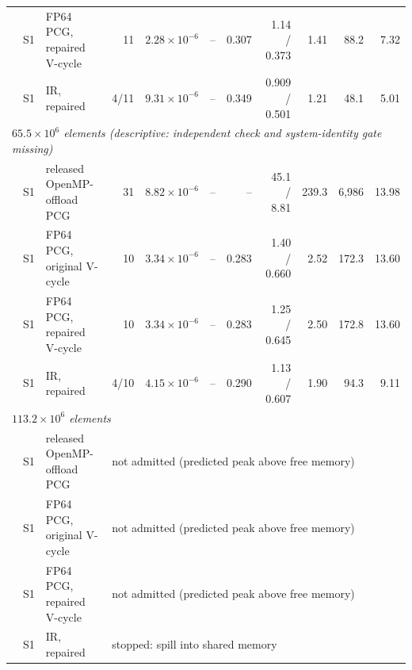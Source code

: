 \begin{tabular}{rllrrrrrrrr}
 & S1 & FP64 PCG, repaired V-cycle & 11 & $2.28\times10^{-6}$ & -- & 0.307 & 1.14 / 0.373 & 1.41 & 88.2 & 7.32 \\
 & S1 & IR, repaired & 4/11 & $9.31\times10^{-6}$ & -- & 0.349 & 0.909 / 0.501 & 1.21 & 48.1 & 5.01 \\
\midrule
\multicolumn{11}{l}{\emph{$65.5\times10^{6}$ elements (descriptive: independent check and system-identity gate missing)}} \\
 & S1 & released OpenMP-offload PCG & 31 & $8.82\times10^{-6}$ & -- & -- & 45.1 / 8.81 & 239.3 & 6{,}986 & 13.98 \\
 & S1 & FP64 PCG, original V-cycle & 10 & $3.34\times10^{-6}$ & -- & 0.283 & 1.40 / 0.660 & 2.52 & 172.3 & 13.60 \\
 & S1 & FP64 PCG, repaired V-cycle & 10 & $3.34\times10^{-6}$ & -- & 0.283 & 1.25 / 0.645 & 2.50 & 172.8 & 13.60 \\
 & S1 & IR, repaired & 4/10 & $4.15\times10^{-6}$ & -- & 0.290 & 1.13 / 0.607 & 1.90 & 94.3 & 9.11 \\
\midrule
\multicolumn{11}{l}{\emph{$113.2\times10^{6}$ elements}} \\
 & S1 & released OpenMP-offload PCG & \multicolumn{8}{l}{not admitted (predicted peak above free memory)} \\
 & S1 & FP64 PCG, original V-cycle & \multicolumn{8}{l}{not admitted (predicted peak above free memory)} \\
 & S1 & FP64 PCG, repaired V-cycle & \multicolumn{8}{l}{not admitted (predicted peak above free memory)} \\
 & S1 & IR, repaired & \multicolumn{8}{l}{stopped: spill into shared memory} \\
\bottomrule
\end{tabular}
